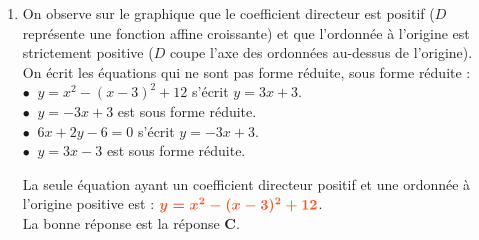\documentclass[a4paper,11pt]{article}
\begin{document}
\begin{seance}{}
\begin{enumerate}
\item On observe sur le graphique que le coefficient directeur est positif ($D$ représente une fonction affine croissante) et que l'ordonnée à l'origine est strictement positive ($D$ coupe l'axe des ordonnées au-dessus de l'origine).\\On écrit les équations qui ne sont pas forme réduite, sous forme réduite :\\$\bullet\:$ $y=x^2-(x-3)^2+12$ s'écrit $y=3x+3$.\\$\bullet\:$ $y=-3x+3$ est  sous forme réduite.\\$\bullet\:$ $6x+2y-6=0$ s'écrit $y=-3x+3$.\\$\bullet\:$ $y=3x-3$ est  sous forme réduite.

\medskip
La seule équation ayant un coefficient directeur positif et une ordonnée à l'origine positive est : ${\color[HTML]{F15929}\boldsymbol{y=x^2-(x-3)^2+12}}$.\\La bonne réponse est la réponse {\bfseries \color[HTML]{F15929}C}.

\end{enumerate}

\end{seance}
\end{document}
